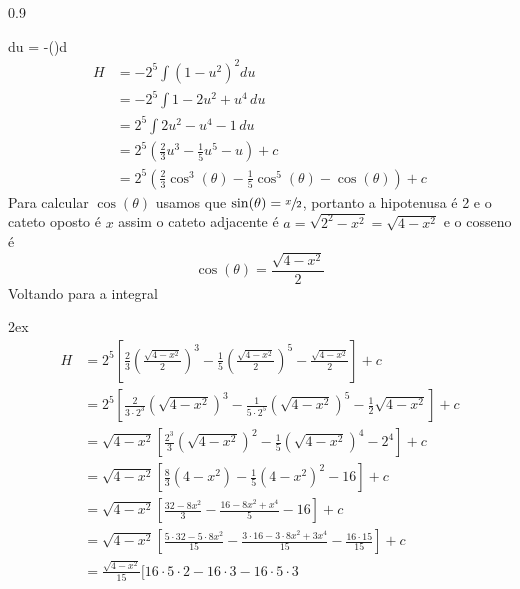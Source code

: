 \documentclass[a4paper,12pt,fleqn]{article}
\newenvironment{resposta}%
  {\begingroup\color{blue}\small\begin{spacing}{0.9}}%
  {\end{spacing}\endgroup}
\begin{document}
\begin{resposta}
\begin{enumerate}[label=\alph*)]
        \qquad
        du = -\sin(\theta)d\theta
      \)
      \begin{align*}
        H
        & = -2^5 \int \left(1-u^2\right)^2 du \\
        & = -2^5 \int 1-2u^2 + u^4\, du \\
        & = 2^5 \int 2u^2 - u^4 -1\, du \\
        & = 2^5 \left(\frac{2}{3}u^3 - \frac{1}{5}u^5 - u \right) + c \\
        & = 2^5 \left(\frac{2}{3}\cos^3(\theta)
         - \frac{1}{5}\cos^5(\theta)
         - \cos(\theta) \right) + c
      \end{align*}
      Para calcular \(\cos(\theta)\) usamos que \(\sin(\theta) = \sfrac{x}{2}\), portanto
      a hipotenusa é 2 e o cateto oposto é $x$ assim o cateto adjacente é
      \(
        a = \sqrt{2^2-x^2} = \sqrt{4-x^2}
      \)
      e o cosseno é
      \[
        \cos(\theta) = \frac{\sqrt{4-x^2}}{2}
      \]
      Voltando para a integral
      \begin{spreadlines}{2ex}
      \begin{align*}
        H
        & = 2^5\left[
            \frac{2}{3}\left(\frac{\sqrt{4-x^2}}{2}\right)^3
            - \frac{1}{5}\left(\frac{\sqrt{4-x^2}}{2}\right)^5
            - \frac{\sqrt{4-x^2}}{2}
          \right] + c \\
        & = 2^5\left[
            \frac{2}{3\cdot 2^3}\left(\sqrt{4-x^2}\right)^3
          - \frac{1}{5\cdot 2^5}\left(\sqrt{4-x^2}\right)^5
          - \frac{1}{2} \sqrt{4-x^2}
          \right] + c \\
        & = \sqrt{4-x^2}
            \left[
              \frac{2^3}{3}\left(\sqrt{4-x^2}\right)^2
            - \frac{1}  {5}\left(\sqrt{4-x^2}\right)^4
            - 2^4
            \right] + c \\
        & = \sqrt{4-x^2}
            \left[
              \frac{8}{3}\left(4-x^2\right)
            - \frac{1}{5}\left(4-x^2\right)^2
            - 16
            \right] + c \\
        & = \sqrt{4-x^2}
            \left[
              \frac{32-8x^2}{3}
            - \frac{16-8x^2+x^4}{5}
            - 16
            \right] + c \\
        & = \sqrt{4-x^2}
            \left[
               \frac{5\cdot 32 - 5\cdot 8x^2}{15}
              -\frac{3\cdot 16 - 3\cdot 8x^2 + 3x^4}{15} - \frac{16\cdot 15}{15}
            \right] + c \\
        & = \frac{\sqrt{4-x^2}}{15}
            \Big[
              16\cdot 5\cdot 2 - 16 \cdot 3 - 16\cdot 5 \cdot 3

\end{align*}
\end{spreadlines}
\end{enumerate}
\end{resposta}
\end{document}
